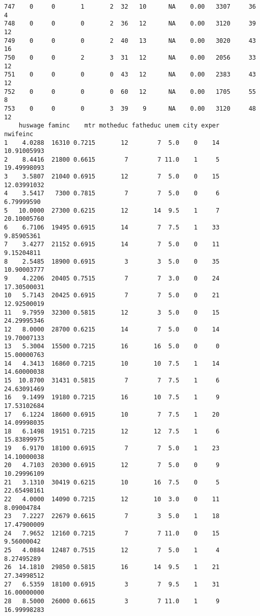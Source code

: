 \documentclass[
  letterpaper,
  DIV=11,
  numbers=noendperiod]{scrreprt}
\begin{document}
\begin{verbatim}
747    0     0       1       2  32   10      NA    0.00   3307     36       4
748    0     0       0       2  36   12      NA    0.00   3120     39      12
749    0     0       0       2  40   13      NA    0.00   3020     43      16
750    0     0       2       3  31   12      NA    0.00   2056     33      12
751    0     0       0       0  43   12      NA    0.00   2383     43      12
752    0     0       0       0  60   12      NA    0.00   1705     55       8
753    0     0       0       3  39    9      NA    0.00   3120     48      12
    huswage faminc    mtr motheduc fatheduc unem city exper    nwifeinc
1    4.0288  16310 0.7215       12        7  5.0    0    14 10.91005993
2    8.4416  21800 0.6615        7        7 11.0    1     5 19.49998093
3    3.5807  21040 0.6915       12        7  5.0    0    15 12.03991032
4    3.5417   7300 0.7815        7        7  5.0    0     6  6.79999590
5   10.0000  27300 0.6215       12       14  9.5    1     7 20.10005760
6    6.7106  19495 0.6915       14        7  7.5    1    33  9.85905361
7    3.4277  21152 0.6915       14        7  5.0    0    11  9.15204811
8    2.5485  18900 0.6915        3        3  5.0    0    35 10.90003777
9    4.2206  20405 0.7515        7        7  3.0    0    24 17.30500031
10   5.7143  20425 0.6915        7        7  5.0    0    21 12.92500019
11   9.7959  32300 0.5815       12        3  5.0    0    15 24.29995346
12   8.0000  28700 0.6215       14        7  5.0    0    14 19.70007133
13   5.3004  15500 0.7215       16       16  5.0    0     0 15.00000763
14   4.3413  16860 0.7215       10       10  7.5    1    14 14.60000038
15  10.8700  31431 0.5815        7        7  7.5    1     6 24.63091469
16   9.1499  19180 0.7215       16       10  7.5    1     9 17.53102684
17   6.1224  18600 0.6915       10        7  7.5    1    20 14.09998035
18   6.1498  19151 0.7215       12       12  7.5    1     6 15.83899975
19   6.9170  18100 0.6915        7        7  5.0    1    23 14.10000038
20   4.7103  20300 0.6915       12        7  5.0    0     9 10.29996109
21   3.1310  30419 0.6215       10       16  7.5    0     5 22.65498161
22   4.0000  14090 0.7215       12       10  3.0    0    11  8.09004784
23   7.2227  22679 0.6615        7        3  5.0    1    18 17.47900009
24   7.9652  12160 0.7215        7        7 11.0    0    15  9.56000042
25   4.0884  12487 0.7515       12        7  5.0    1     4  8.27495289
26  14.1810  29850 0.5815       16       14  9.5    1    21 27.34998512
27   6.5359  18100 0.6915        3        7  9.5    1    31 16.00000000
28   8.5000  26000 0.6615        3        7 11.0    1     9 16.99998283

\end{verbatim}
\end{document}

